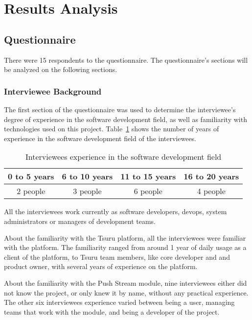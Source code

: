 \section{Results Analysis} \label{section-results}

\subsection{Questionnaire}

There were 15 respondents to the questionnaire. The questionnaire's sections will be analyzed on the following sections.

\subsubsection{Interviewee Background}

The first section of the questionnaire was used to determine the interviewee's degree of experience in the software development field, as well as familiarity with technologies used on this project. Table~\ref{table:result-experience} shows the number of years of experience in the software development field of the interviewees.

\begin{table}[h!]
    \centering
    \begin{tabular}{|c|c|c|c|}
        \hline
        0 to 5 years & 6 to 10 years & 11 to 15 years & 16 to 20 years \\
        \hline
        2 people & 3 people & 6 people & 4 people \\
        \hline
    \end{tabular}
    \caption{Interviewees experience in the software development field}
    \label{table:result-experience}
\end{table}

All the interviewees work currently as software developers, devops, system administrators or managers of development teams.

About the familiarity with the Tsuru platform, all the interviewees were familiar with the platform. The familiarity ranged from around 1 year of daily usage as a client of the platform, to Tsuru team members, like core developer and and product owner, with several years of experience on the platform.

About the familiarity with the Push Stream module, nine interviewees either did not know the project, or only knew it by name, without any practical experience. The other six interviewees experience varied between being a user, managing teams that work with the module, and being a developer of the project.

